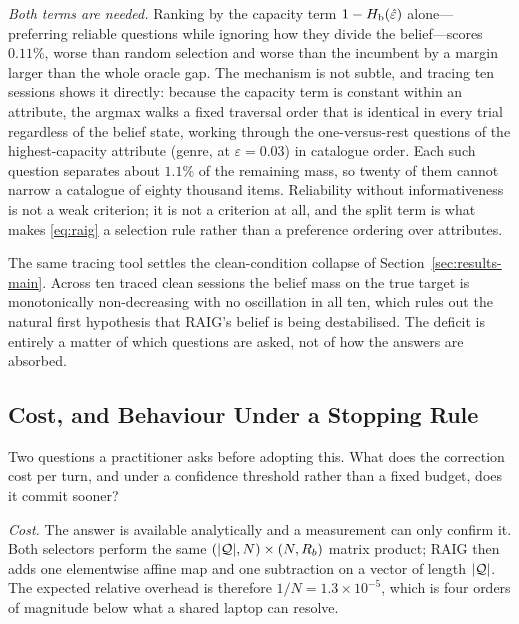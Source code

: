 \emph{Both terms are needed.} Ranking by the capacity term $1-H_{\mathrm{b}}(\hat\varepsilon)$
alone---preferring reliable questions while ignoring how they divide the
belief---scores $0.11\%$, worse than random selection and worse than the
incumbent by a margin larger than the whole oracle gap. The mechanism is not
subtle, and tracing ten sessions shows it directly: because the capacity term
is constant within an attribute, the argmax walks a fixed traversal order that
is identical in every trial regardless of the belief state, working through the
one-versus-rest questions of the highest-capacity attribute (genre, at
$\varepsilon = 0.03$) in catalogue order. Each such question separates about
$1.1\%$ of the remaining mass, so twenty of them cannot narrow a catalogue of
eighty thousand items. Reliability without informativeness is not a weak
criterion; it is not a criterion at all, and the split term is what makes
\eqref{eq:raig} a selection rule rather than a preference ordering over
attributes.

The same tracing tool settles the clean-condition collapse of
Section~\ref{sec:results-main}. Across ten traced clean sessions the belief
mass on the true target is monotonically non-decreasing with no oscillation in
all ten, which rules out the natural first hypothesis that RAIG's belief is
being destabilised. The deficit is entirely a matter of which questions are
asked, not of how the answers are absorbed.


\subsection{Cost, and Behaviour Under a Stopping Rule}
\label{sec:results-efficiency}

Two questions a practitioner asks before adopting this. What does the
correction cost per turn, and under a confidence threshold rather than a fixed
budget, does it commit sooner?

\emph{Cost.} The answer is available analytically and a measurement can only
confirm it. Both selectors perform the same $(|\mathcal{Q}|, N) \times (N, R_b)$
matrix product; RAIG then adds one elementwise affine map and one subtraction
on a vector of length $|\mathcal{Q}|$. The expected relative overhead is therefore
$1/N = 1.3\times10^{-5}$, which is four orders of magnitude below what a shared
laptop can resolve.

